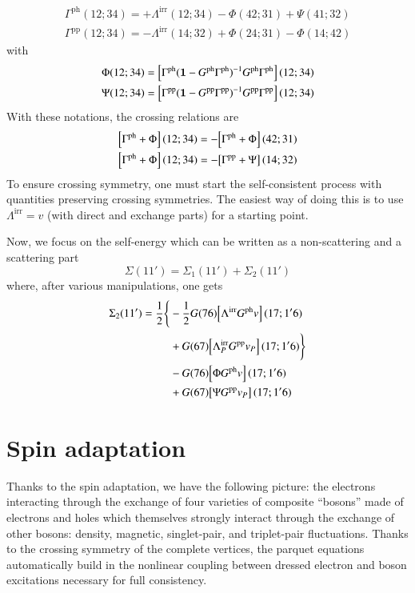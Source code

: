 \documentclass[aip,jcp,reprint,noshowkeys,superscriptaddress]{revtex4-1}
\newcommand{\bI}{\boldsymbol{1}}
\newcommand{\ph}{\text{ph}}
\newcommand{\pp}{\text{pp}}
\newcommand{\irr}{\text{irr}}
\begin{document}
\begin{gather}
    \Gamma^\ph(12;34) = + \Lambda^\irr(12;34) - \Phi(42;31) + \Psi(41;32)
    \\
    \Gamma^\pp(12;34) = - \Lambda^\irr(14;32) + \Phi(24;31) - \Phi(14;42)
\end{gather}
with
\begin{gather}
    \Phi(12;34) = \qty[ \Gamma^\ph (\bI - G^\ph \Gamma^\ph)^{-1} G^\ph \Gamma^\ph ](12;34)
    \\
    \Psi(12;34) = \qty[ \Gamma^\pp (\bI - G^\pp \Gamma^\pp)^{-1} G^\pp \Gamma^\pp ](12;34)
\end{gather}
With these notations, the crossing relations are
\begin{gather}
	\qty[ \Gamma^\ph + \Phi ](12;34) = - \qty[ \Gamma^\ph + \Phi ](42;31)
	\\
	\qty[ \Gamma^\ph + \Phi ](12;34) = - \qty[ \Gamma^\pp + \Psi ](14;32)
\end{gather}
To ensure crossing symmetry, one must start the self-consistent process with quantities preserving crossing symmetries.
The easiest way of doing this is to use $\Lambda^\irr = v$  (with direct and exchange parts) for a starting point.

Now, we focus on the self-energy which can be written as a non-scattering and a scattering part
\begin{equation}
	\Sigma(11') = \Sigma_1(11') + \Sigma_2(11')
\end{equation}
where, after various manipulations, one gets
\begin{equation}
\begin{split}
	\Sigma_2(11') 
	= \frac{1}{2} \Bigg\{ 
	& - \frac{1}{2} G(76) \qty[ 
	\Lambda^\irr G^\ph v ](17;1'6) 
	\\
	& + G(67) \qty[ \Lambda^\irr_P G^\pp v_P ](17;1'6)
	\Bigg\}
	\\
	& - G(76) \qty[ \Phi G^\ph v ](17;1'6)
	\\
	& + G(67) \qty[ \Psi G^\pp v_P ](17;1'6)
\end{split}
\end{equation}


\section{Spin adaptation}
Thanks to the spin adaptation, we have the following picture: the electrons interacting through the exchange of four varieties of composite ``bosons'' made of electrons and holes which themselves strongly interact through the exchange of other bosons: density, magnetic, singlet-pair, and triplet-pair fluctuations. 
Thanks to the crossing symmetry of the complete vertices, the parquet equations automatically build in the nonlinear coupling between dressed electron and boson excitations necessary for full consistency.
\end{document}
